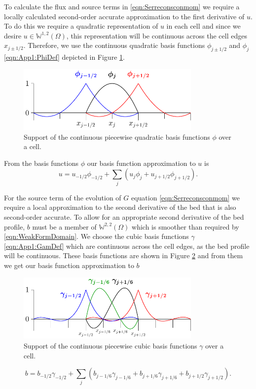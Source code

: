 To calculate the flux and source terms in \eqref{eqn:Serreconsconmom} we require a locally  calculated second-order accurate approximation to the first derivative of $u$. To do this we require a quadratic representation of $u$ in each cell and since we desire $u\in\mathbb{W}^{1,2}(\Omega)$, this representation will be continuous across the cell edges $x_{j \pm 1/2}$. Therefore, we use the continuous quadratic basis functions $\phi_{j\pm1/2} $ and $\phi_{j} $ \eqref{eqn:App1:PhiDef} depicted in Figure \ref{fig:P2ContBasis}.
\begin{figure}
	\centering
	\includegraphics[width=0.8\textwidth]{./chp3/figures/P2.pdf}
	\caption{Support of the continuous piecewise quadratic basis functions $\phi$ over a cell.}
	\label{fig:P2ContBasis}
\end{figure}

From the basis functions $\phi$ our basis function approximation to $u$ is
\begin{equation}
u = u_{-1/2}\phi_{-1/2} + \sum_j \left( u_{j}\phi_{j} + u_{j+1/2}\phi_{j+1/2} \right).
\label{eqn:FEapproxtou}
\end{equation}

For the source term of the evolution of $G$ equation \eqref{eqn:Serreconsconmom} we require a local approximation to the second derivative of the bed that is also second-order accurate. To allow for an appropriate second derivative of the bed profile, $b$ must be a member of $\mathbb{W}^{2,2}(\Omega)$ which is smoother than required by \eqref{eqn:WeakFormDomain}. We choose the cubic basis functions $\gamma$ \eqref{eqn:App1:GamDef} which are continuous across the cell edges, as the bed profile will be continuous. These basis functions are shown in Figure \ref{fig:P3ContBasis} and from them we get our basis function approximation to $b$
\begin{figure}
	\centering
	\includegraphics[width=0.8\textwidth]{./chp3/figures/P3.pdf}
	\caption{Support of the continuous piecewise cubic basis functions $\gamma$ over a cell.}
	\label{fig:P3ContBasis}
\end{figure}
\begin{equation}
b = b_{-1/2}\gamma_{-1/2} +  \sum_j \left(b_{j-1/6}\gamma_{j-1/6}  + b_{j+1/6}\gamma_{j+1/6} + b_{j+1/2}\gamma_{j+1/2} \right).
\label{eqn:FEapproxtob}
\end{equation}

